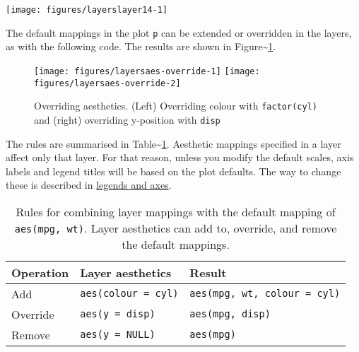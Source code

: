\texttt{[image: figures/layerslayer14-1]}

The default mappings in the plot \texttt{p} can be extended or
overridden in the layers, as with the following code.
 The results are shown in
Figure\textasciitilde{}\ref{fig:aes-override}.

\begin{Shaded}
\begin{Highlighting}[]
\StringTok{ }\NormalTok{(}\NormalTok{(} 
\StringTok{ }\NormalTok{(}\NormalTok{(} 
\end{Highlighting}
\end{Shaded}

\begin{figure}
\texttt{[image: figures/layersaes-override-1]} \texttt{[image: figures/layersaes-override-2]} \caption{Overriding aesthetics. (Left) Overriding colour with \texttt{factor(cyl)} and (right) overriding y-position with \texttt{disp}\label{fig:aes-override}}
\end{figure}

\noindent The rules are summarised in
Table\textasciitilde{}\ref{tbl:aes-override}. Aesthetic mappings
specified in a layer affect only that layer. For that reason, unless you
modify the default scales, axis labels and legend titles will be based
on the plot defaults. The way to change these is described in
\hyperref[sec:guides]{legends and axes}.

\begin{table}[ht]
\centering
\begin{tabular}{lll}
  \hline
Operation & Layer aesthetics & Result \\ 
  \hline
Add & \texttt{aes(colour = cyl)} & \texttt{aes(mpg, wt, colour = cyl)} \\ 
  Override & \texttt{aes(y = disp)} & \texttt{aes(mpg, disp)} \\ 
  Remove & \texttt{aes(y = NULL)} & \texttt{aes(mpg)} \\ 
   \hline
\end{tabular}
\caption{Rules for combining layer mappings with the default mapping of \texttt{aes(mpg, wt)}.  Layer aesthetics can add to, override, and remove the default mappings.} 
\label{tbl:aes-override}
\end{table}

